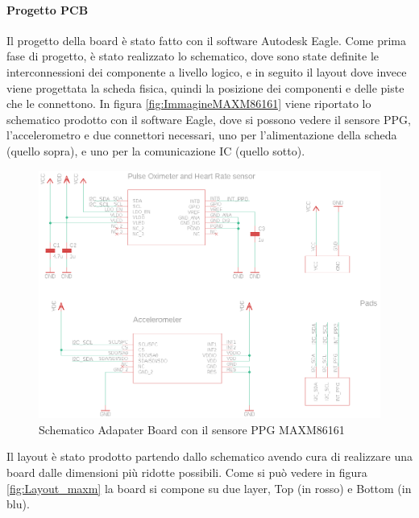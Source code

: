 \paragraph{Progetto PCB} Il progetto della board è stato fatto con il software Autodesk Eagle. Come prima fase di progetto, è stato realizzato lo schematico, dove sono state definite le interconnessioni dei componente a livello logico, e in seguito il layout dove invece viene progettata la scheda fisica, quindi la posizione dei componenti e delle piste che le connettono.
In figura \ref{fig:ImmagineMAXM86161} viene riportato lo schematico prodotto con il software Eagle, dove si possono vedere il sensore PPG, l'accelerometro e due connettori necessari, uno per l'alimentazione della scheda (quello sopra), e uno per la comunicazione IC (quello sotto).
\begin{figure}[h]
	\centering
	\includegraphics[width=0.8\linewidth]{ImageFiles/Hardware/schematic_maxm}
	\caption{Schematico Adapater Board con il sensore PPG MAXM86161}
	\label{fig:schematic_maxm}
\end{figure}
Il layout è stato prodotto partendo dallo schematico avendo cura di realizzare una board dalle dimensioni più ridotte possibili. Come si può vedere in figura \ref{fig:Layout_maxm} la board si compone su due layer, Top (in rosso) e Bottom (in blu).
